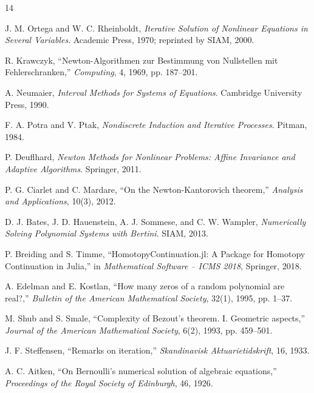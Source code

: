 \documentclass[11pt]{article}
\theoremstyle{definition}
\theoremstyle{remark}
\begin{document}
\begin{thebibliography}{14}

J. M. Ortega and W. C. Rheinboldt,
\emph{Iterative Solution of Nonlinear Equations in Several Variables}.
Academic Press, 1970; reprinted by SIAM, 2000.

R. Krawczyk,
``Newton-Algorithmen zur Bestimmung von Nullstellen mit Fehlerschranken,''
\emph{Computing}, 4, 1969, pp. 187--201.

A. Neumaier,
\emph{Interval Methods for Systems of Equations}.
Cambridge University Press, 1990.

F. A. Potra and V. Ptak,
\emph{Nondiscrete Induction and Iterative Processes}.
Pitman, 1984.

P. Deuflhard,
\emph{Newton Methods for Nonlinear Problems: Affine Invariance and Adaptive Algorithms}.
Springer, 2011.

P. G. Ciarlet and C. Mardare,
``On the Newton-Kantorovich theorem,''
\emph{Analysis and Applications}, 10(3), 2012.

D. J. Bates, J. D. Hauenstein, A. J. Sommese, and C. W. Wampler,
\emph{Numerically Solving Polynomial Systems with Bertini}.
SIAM, 2013.

P. Breiding and S. Timme,
``HomotopyContinuation.jl: A Package for Homotopy Continuation in Julia,''
in \emph{Mathematical Software -- ICMS 2018}, Springer, 2018.

A. Edelman and E. Kostlan,
``How many zeros of a random polynomial are real?,''
\emph{Bulletin of the American Mathematical Society}, 32(1), 1995, pp. 1--37.

M. Shub and S. Smale,
``Complexity of Bezout's theorem. I. Geometric aspects,''
\emph{Journal of the American Mathematical Society}, 6(2), 1993, pp. 459--501.

J. F. Steffensen,
``Remarks on iteration,''
\emph{Skandinavisk Aktuarietidskrift}, 16, 1933.

A. C. Aitken,
``On Bernoulli's numerical solution of algebraic equations,''
\emph{Proceedings of the Royal Society of Edinburgh}, 46, 1926.

\end{thebibliography}
\end{document}
